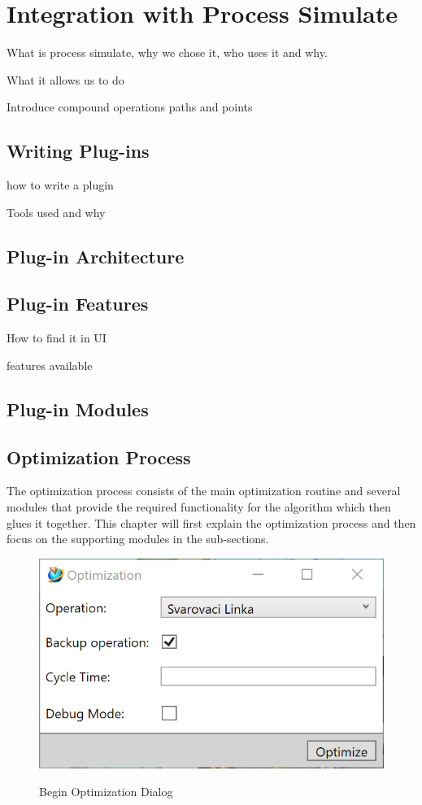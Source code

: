 \chapter{Integration with Process Simulate}
\label{ch:integration}
\graphicspath{{chapters/Integration/}}

What is process simulate, why we chose it, who uses it and why.

What it allows us to do

Introduce compound operations paths and points

\section{Writing Plug-ins}

how to write a plugin

Tools used and why

\section{Plug-in Architecture}

\section{Plug-in Features}
How to find it in UI

features available

\section{Plug-in Modules}

\section{Optimization Process}

The optimization process consists of the main optimization routine and several modules that provide the required functionality for the algorithm which then glues it together. This chapter will first explain the optimization process and then focus on the supporting modules in the sub-sections. \\

\begin{figure}[ht]
	\caption{Begin Optimization Dialog}
	\centering
	\includegraphics{dialog_beginoptimization}
	\label{fig:DialogBeginOptimization}
\end{figure}


